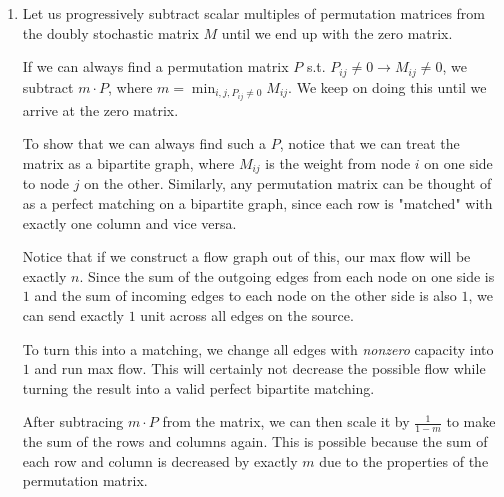 \documentclass[12pt]{article}
\begin{document}
\begin{enumerate}
      \item Let us progressively subtract scalar multiples of permutation matrices
            from the doubly stochastic matrix $M$ until we end up with the zero matrix.

            If we can always find a permutation matrix $P$ s.t. $P_{ij} \ne 0 \to M_{ij} \ne 0$,
            we subtract $m \cdot P$, where $m=\min_{i, j, P_{ij} \ne 0} M_{ij}$.
            We keep on doing this until we arrive at the zero matrix.

            To show that we can always find such a $P$, notice
            that we can treat the matrix as a bipartite graph, where $M_{ij}$
            is the weight from node $i$ on one side to node $j$ on the other.
            Similarly, any permutation matrix can be thought of as a
            perfect matching on a bipartite graph, since each row is "matched"
            with exactly one column and vice versa.

            Notice that if we construct a flow graph out of this,
            our max flow will be exactly $n$.
            Since the sum of the outgoing edges from each node on one side is $1$
            and the sum of incoming edges to each node on the other side is also $1$,
            we can send exactly $1$ unit across all edges on the source.

            To turn this into a matching, we change all edges with
            \textit{nonzero} capacity into $1$ and run max flow.
            This will certainly not decrease the possible flow while
            turning the result into a valid perfect bipartite matching.

            After subtracing $m \cdot P$ from the matrix,
            we can then scale it by $\frac{1}{1-m}$ to make the sum of the rows
            and columns again.
            This is possible because the sum of each row and column
            is decreased by exactly $m$ due to the properties of the permutation matrix.


\end{enumerate}
\end{document}
